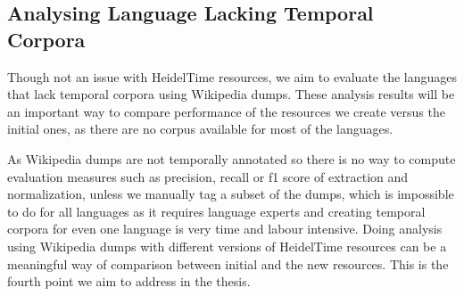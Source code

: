 \subsection{Analysing Language Lacking Temporal Corpora} \label{the-chapter-3-alltc}
Though not an issue with HeidelTime resources, we aim to evaluate the languages that lack temporal corpora using Wikipedia dumps. These analysis results will be an important way to compare performance of the resources we create versus the initial ones, as there are no corpus available for most of the languages.

As Wikipedia dumps are not temporally annotated so there is no way to compute evaluation measures such as precision, recall or f1 score of extraction and normalization, unless we manually tag a subset of the dumps, which is impossible to do for all languages as it requires language experts and creating temporal corpora for even one language is very time and labour intensive. Doing analysis using Wikipedia dumps with different versions of HeidelTime resources can be a meaningful way of comparison between initial and the new resources. This is the fourth point we aim to address in the thesis.

